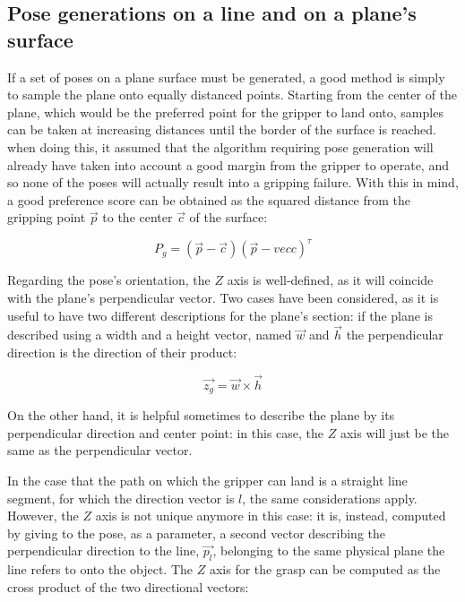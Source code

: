 \subsection{Pose generations on a line and on a plane's surface} \label{sec:pose-generation-line-plane}
If a set of poses on a plane surface must be generated, a good method is simply
to sample the plane onto equally distanced points. Starting from the center of
the plane, which would be the preferred point for the gripper to land onto,
samples can be taken at increasing distances until the border of the surface is
reached. when doing this, it assumed that the algorithm requiring pose
generation will already have taken into account a good margin from the gripper
to operate, and so none of the poses will actually result into a gripping
failure. With this in mind, a good preference score can be obtained as the
squared distance from the gripping point $\vec{p}$ to the center $\vec{c}$ of the surface:

\begin{equation}
P_{g}=(\vec{p}-\vec{c})(\vec{p}-vec{c})^\tau
\end{equation}

Regarding the pose's orientation, the $Z$ axis is well-defined, as it will
coincide with the plane's perpendicular vector. Two cases have been considered,
as it is useful to have two different descriptions for the plane's section: if
the plane is described using a width and a height vector, named $\vec{w}$ and $\vec{h}$ the perpendicular
direction is the direction of their product:

\begin{equation}
  \vec{z_{g}}=\vec{w} \times \vec{h}
\end{equation}

On the other hand, it is helpful sometimes to describe the plane by its
perpendicular direction and center point: in this case, the $Z$ axis will just
be the same as the perpendicular vector.

In the case that the path on which the gripper can land is a straight
line segment, for which the direction vector is $l$, the same considerations apply. However, the $Z$ axis is
not unique anymore in this case: it is, instead, computed by giving
to the pose, as a parameter, a second vector describing the
perpendicular direction to the line, $\vec{p_l}$, belonging to the
same physical plane the line refers to onto the object. The $Z$ axis
for the grasp can be computed as the cross product of the two
directional vectors:

